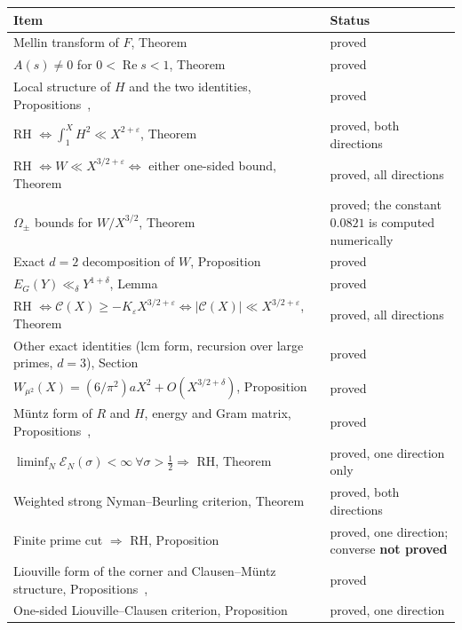 \documentclass[11pt,reqno]{amsart}
\makeatletter
\let\CG@origref\ref
\newcommand{\CG@gettip}[1]{\@ifundefined{CGTip@#1}{Reference: #1}{\csname CGTip@#1\endcsname}}
\DeclareRobustCommand{\CGref}[1]{\pdftooltip{\CG@origref{#1}}{\CG@gettip{#1}}}
\numberwithin{equation}{section}
\theoremstyle{plain}
\theoremstyle{definition}
\theoremstyle{remark}
\makeatother
\begin{document}
\begin{center}
\small
\begin{tabular}{p{}p{}}
\toprule
Item & Status \\
\midrule
Mellin transform of $F$, Theorem~\CGref{thm:mellin} & proved \\
$A(s)\neq0$ for $0<\operatorname{Re}s<1$, Theorem~\CGref{thm:Anonzero} & proved \\
Local structure of $H$ and the two identities, Propositions~\CGref{prop:Hlocal}, \CGref{prop:Hid} & proved \\
RH $\iff\int_1^XH^2\ll X^{2+\varepsilon}$, Theorem~\CGref{thm:L2} & proved, both directions \\
RH $\iff W\ll X^{3/2+\varepsilon}\iff$ either one-sided bound, Theorem~\CGref{thm:Wcrit} & proved, all directions \\
$\Omega_\pm$ bounds for $W/X^{3/2}$, Theorem~\CGref{thm:omega} & proved; the constant $0.0821$ is computed numerically \\
Exact $d=2$ decomposition of $W$, Proposition~\CGref{prop:decomp} & proved \\
$E_G(Y)\ll_\delta Y^{1+\delta}$, Lemma~\CGref{lem:EG} & proved \\
RH $\iff\mathcal C(X)\ge-K_\varepsilon X^{3/2+\varepsilon}\iff|\mathcal C(X)|\ll X^{3/2+\varepsilon}$, Theorem~\CGref{thm:corner} & proved, all directions \\
Other exact identities (lcm form, recursion over large primes, $d=3$), Section~\CGref{sec:other} & proved \\
$W_{\mu^2}(X)=(6/\pi^2)aX^2+O(X^{3/2+\delta})$, Proposition~\CGref{prop:musq} & proved \\
M\"untz form of $R$ and $H$, energy and Gram matrix, Propositions~\CGref{prop:muntz}, \CGref{prop:energy} & proved \\
$\liminf_N\mathcal E_N(\sigma)<\infty\ \forall\sigma>\frac12\Rightarrow$ RH, Theorem~\CGref{thm:energy} & proved, one direction only \\
Weighted strong Nyman--Beurling criterion, Theorem~\CGref{thm:nb} & proved, both directions \\
Finite prime cut $\Rightarrow$ RH, Proposition~\CGref{prop:primecut} & proved, one direction; converse \textbf{not proved} \\
Liouville form of the corner and Clausen--M\"untz structure, Propositions~\CGref{prop:liouville}, \CGref{prop:clausenmuntz} & proved \\
One-sided Liouville--Clausen criterion, Proposition~\CGref{prop:lambdacrit} & proved, one direction \\

\end{tabular}
\end{center}
\end{document}
